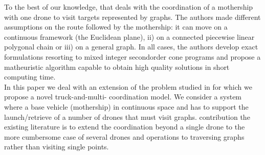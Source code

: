 To the best of our knowledge,  that deals with the coordination of a mothership with one drone to visit targets represented by graphs. The authors made different assumptions on the route followed by the mothership: it can move on a continuous framework (the Euclidean plane), ii) on a connected piecewise linear polygonal chain\RE{,} or iii) on a general graph. In all cases, the authors develop exact formulations resorting to mixed integer second\RE{-}order cone programs and propose a matheuristic algorithm capable to obtain high quality solutions in short computing time.
\\
In this paper we deal with an extension of the problem studied in \cite{art:Amorosi2021} for which we propose a novel truck-and-multi- coordination model. We consider a system where a base vehicle (mothership)  in  continuous space and has to support the launch/retrieve of a number of drones that must visit graphs.  contribution  the existing literature is to extend the coordination beyond a single drone to the more cumbersome case of several drones and operations to traversing graphs rather than visiting single points. 
\noindent
{}
\noindent

